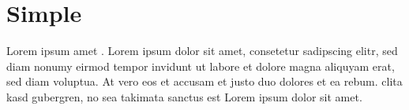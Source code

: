\documentclass{article}
\begin{document}
\section{Simple}

Lorem ipsum  amet . Lorem ipsum dolor sit
amet, consetetur sadipscing elitr, sed diam nonumy eirmod tempor
invidunt ut labore et dolore magna aliquyam erat, sed diam voluptua. At
vero eos et accusam et justo duo dolores et ea rebum.  clita
kasd gubergren, no sea takimata sanctus est Lorem ipsum dolor sit amet.
\end{document}
